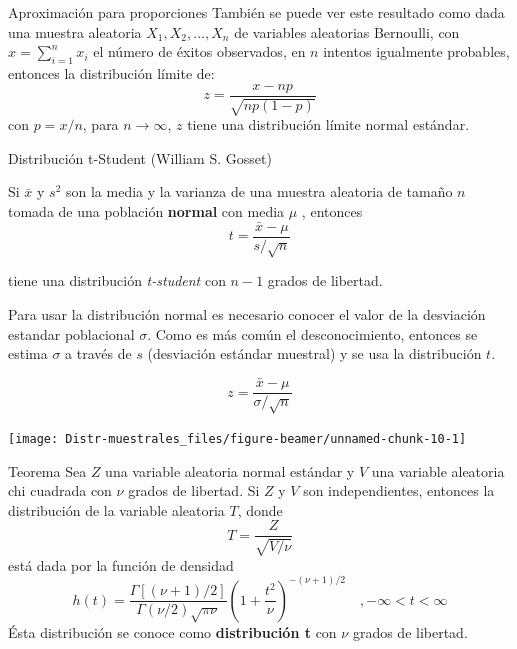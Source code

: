 \documentclass[
  10pt,
  ignorenonframetext,
]{beamer}
\begin{document}
\begin{frame}{}
\protect\hypertarget{section-26}{}
\begin{block}{Aproximación para proporciones}
\protect\hypertarget{aproximaciuxf3n-para-proporciones}{}
También se puede ver este resultado como dada una muestra aleatoria
\(X_1, X_2, \ldots, X_n\) de variables aleatorias Bernoulli, con
\(x =\sum_{i=1}^n x_i\) el número de éxitos observados, en \(n\)
intentos igualmente probables, entonces la distribución límite de:
\[z=\frac{x-np}{\sqrt{n p (1-p)}}\] con \(p=x/n\), para
\(n \to \infty\), \(z\) tiene una distribución límite normal estándar.
\end{block}
\end{frame}

\begin{frame}{Distribución t-Student (William S. Gosset)}
\protect\hypertarget{distribuciuxf3n-t-student-william-s.-gosset}{}
\begin{block}{}
\protect\hypertarget{section-27}{}
Si \(\bar{x}\) y \(s^2\) son la media y la varianza de una muestra
aleatoria de tamaño \(n\) tomada de una población \textbf{normal} con
media \(\mu\) , entonces \[t=\frac{\bar{x}-\mu}{s/\sqrt{n}}\]

tiene una distribución \emph{t-student} con \(n-1\) grados de libertad.

Para usar la distribución normal es necesario conocer el valor de la
desviación estandar poblacional \(\sigma\). Como es más común el
desconocimiento, entonces se estima \(\sigma\) a través de \(s\)
(desviación estándar muestral) y se usa la distribución \(t\).

\[z=\frac{\bar{x}-\mu}{\sigma /\sqrt{n}}\]
\end{block}
\end{frame}

\begin{frame}{}
\protect\hypertarget{section-28}{}
\begin{center}\texttt{[image: Distr-muestrales\_files/figure-beamer/unnamed-chunk-10-1]} \end{center}
\end{frame}

\begin{frame}{}
\protect\hypertarget{section-29}{}
\begin{block}{Teorema}
\protect\hypertarget{teorema}{}
Sea \(Z\) una variable aleatoria normal estándar y \(V\) una variable
aleatoria chi cuadrada con \(\nu\) grados de libertad. Si \(Z\) y \(V\)
son independientes, entonces la distribución de la variable aleatoria
\(T\), donde \[T=\frac{Z}{\sqrt{V/\nu}}\] está dada por la función de
densidad
\[h(t)=\frac{\Gamma[(\nu+1)/2]}{\Gamma(\nu/2)\sqrt{\pi \nu}}\left(1+\frac{t^2}{\nu}\right)^{-(\nu +1)/2}\quad , -\infty <t<\infty\]
Ésta distribución se conoce como \textbf{distribución t} con \(\nu\)
grados de libertad.
\end{block}
\end{frame}
\end{document}
